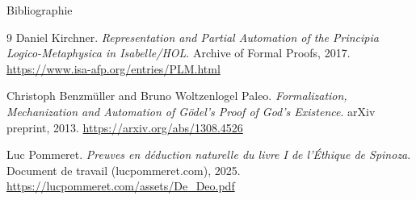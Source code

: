 \documentclass[aspectratio=169]{beamer}
\begin{document}
\begin{frame}[allowframebreaks]{Bibliographie}
\begin{thebibliography}{9}
    Daniel Kirchner.
    \newblock \emph{Representation and Partial Automation of the Principia Logico-Metaphysica in Isabelle/HOL}.
    \newblock Archive of Formal Proofs, 2017.
    \newblock \url{https://www.isa-afp.org/entries/PLM.html}

    Christoph Benzmüller and Bruno Woltzenlogel Paleo.
    \newblock \emph{Formalization, Mechanization and Automation of Gödel's Proof of God's Existence}.
    \newblock arXiv preprint, 2013.
    \newblock \url{https://arxiv.org/abs/1308.4526}

    Luc Pommeret.
    \newblock \emph{Preuves en déduction naturelle du livre I de l'Éthique de Spinoza}.
    \newblock Document de travail (lucpommeret.com), 2025.
    \newblock \url{https://lucpommeret.com/assets/De_Deo.pdf}

  \end{thebibliography}
\end{frame}
\end{document}
